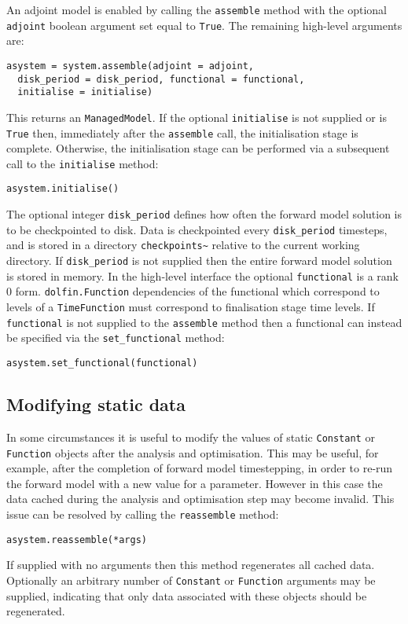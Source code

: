 \documentclass[a4paper]{book}
\begin{document}
An adjoint model is enabled by calling the \verb+assemble+ method with the
optional \verb+adjoint+ boolean argument set equal to \verb+True+. The remaining
high-level arguments are:
\begin{lstlisting}
asystem = system.assemble(adjoint = adjoint,
  disk_period = disk_period, functional = functional,
  initialise = initialise)
\end{lstlisting}
This returns an \verb+ManagedModel+. If the optional \verb+initialise+ is not
supplied or is \verb+True+ then, immediately after the \verb+assemble+ call, the
initialisation stage is complete. Otherwise, the initialisation stage can be
performed via a subsequent call to the \verb+initialise+ method:
\begin{lstlisting}
asystem.initialise()
\end{lstlisting}
The optional integer \verb+disk_period+ defines how often the forward model
solution is to be checkpointed to disk. Data is checkpointed every
\verb+disk_period+ timesteps, and is stored in a directory \verb+checkpoints~+
relative to the current working directory. If \verb+disk_period+ is not supplied
then the entire forward model solution is stored in memory. In the high-level
interface the optional \verb+functional+ is a rank 0 form.
\verb+dolfin.Function+ dependencies of the functional which correspond to levels
of a \verb+TimeFunction+ must correspond to finalisation stage time levels. If
\verb+functional+ is not supplied to the \verb+assemble+ method then a
functional can instead be specified via the \verb+set_functional+ method:
\begin{lstlisting}
asystem.set_functional(functional)
\end{lstlisting}

\subsection{Modifying static data}\label{sect:reassembly}

In some circumstances it is useful to modify the values of static \verb+Constant+
or \verb+Function+ objects after the analysis and optimisation. This may be
useful, for example, after the completion of forward model timestepping, in
order to re-run the forward model with a new value for a parameter. However in
this case the data cached during the analysis and optimisation step may become
invalid. This issue can be resolved by calling the \verb+reassemble+ method:
\begin{lstlisting}
asystem.reassemble(*args)
\end{lstlisting}
If supplied with no arguments then this method regenerates all cached data.
Optionally an arbitrary number of \verb+Constant+ or \verb+Function+ arguments
may be supplied, indicating that only data associated with these objects should
be regenerated.
\end{document}

